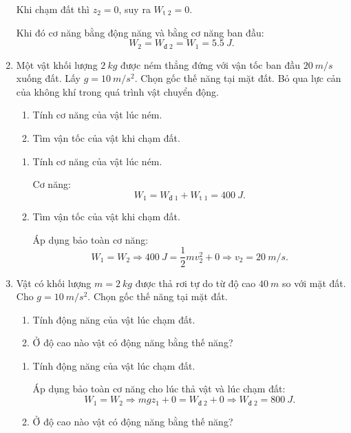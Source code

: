 \begin{enumerate}[label=\bfseries Câu \arabic*:]
{\begin{enumerate}[label=\alph*)]
			Khi chạm đất thì $z_2 = 0$, suy ra $W_\text{t 2} = 0$.
			
			Khi đó cơ năng bằng động năng và bằng cơ năng ban đầu:
			$$W_2 = W_\text{đ 2} = W_1 = \SI{5.5}{J}.$$
		\end{enumerate}
	}
	\item {}
	
	
	{
		Một vật khối lượng $\SI{2}{kg}$ được ném thẳng đứng với vận tốc ban đầu $\SI{20}{m/s}$ xuống đất. Lấy $g=\SI{10}{m/s^2}$. Chọn gốc thế năng tại mặt đất. Bỏ qua lực cản của không khí trong quá trình vật chuyển động.
		\begin{enumerate}[label=\alph*)]
			\item Tính cơ năng của vật lúc ném.
			\item Tìm vận tốc của vật khi chạm đất.
		\end{enumerate}
	}
	
	\hideall
	{	
		\begin{enumerate}[label=\alph*)]
			\item Tính cơ năng của vật lúc ném.
			
			Cơ năng:
			$$W_1 = W_\text{đ 1} + W_\text{t 1} = \SI{400}{J}.$$
			\item Tìm vận tốc của vật khi chạm đất.
			
			Áp dụng bảo toàn cơ năng:
			$$W_1 = W_2 \Rightarrow \SI{400}{J} = \dfrac{1}{2}mv_2^2 + 0 \Rightarrow v_2 = \SI{20}{m/s}.$$
		\end{enumerate}
	}
		\item {}
	
	
	{
			Vật có khối lượng $m=\SI{2}{kg}$ được thả rơi tự do từ độ cao $\SI{40}{m}$ so với mặt đất. Cho $g=\SI{10}{m/s^2}$. Chọn gốc thế năng tại mặt đất.
		\begin{enumerate}[label=\alph*)]
			\item Tính động năng của vật lúc chạm đất.
			\item Ở độ cao nào vật có động năng bằng thế năng?
		\end{enumerate}
	}
	
	\hideall
	{	
		\begin{enumerate}[label=\alph*)]
			\item Tính động năng của vật lúc chạm đất.
			
			Áp dụng bảo toàn cơ năng cho lúc thả vật và lúc chạm đất:
			$$W_1 = W_2 \Rightarrow mgz_1 + 0 = W_\text{đ 2} + 0 \Rightarrow W_\text{đ 2} = \SI{800}{J}.$$
			
			\item Ở độ cao nào vật có động năng bằng thế năng?
			

\end{enumerate}}
\end{enumerate}
